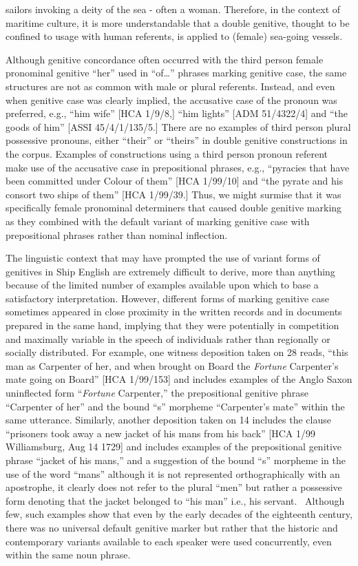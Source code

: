 sailors invoking a deity of the sea - often a woman. Therefore, in the context of maritime culture, it is more understandable that a double genitive, thought to be confined to usage with human referents, is applied to (female) sea-going vessels. 

  Although genitive concordance often occurred with the third person female pronominal genitive “her” used in “of…” phrases marking genitive case, the same structures are not as common with male or plural referents. Instead, and even when genitive case was clearly implied, the accusative case of the pronoun was preferred, e.g., “him wife” [HCA 1/9/8,] “him lights” [ADM 51/4322/4] and “the goods of him” [ASSI 45/4/1/135/5.] There are no examples of third person plural possessive pronouns, either “their” or “theirs” in double genitive constructions in the corpus. Examples of constructions using a third person pronoun referent make use of the accusative case in prepositional phrases, e.g., “pyracies that have been committed under Colour of them” [HCA 1/99/10] and “the pyrate and his consort two ships of them” [HCA 1/99/39.] Thus, we might surmise that it was specifically female pronominal determiners that caused double genitive marking as they combined with the default variant of marking genitive case with prepositional phrases rather than nominal inflection. 

  The linguistic context that may have prompted the use of variant forms of genitives in Ship English are extremely difficult to derive, more than anything because of the limited number of examples available upon which to base a satisfactory interpretation. However, different forms of marking genitive case sometimes appeared in close proximity in the written records and in documents prepared in the same hand, implying that they were potentially in competition and maximally variable in the speech of individuals rather than regionally or socially distributed. For example, one witness deposition taken on 28 \citealt{March1722} reads, “this man as Carpenter of her, and when brought on Board the \textit{Fortune} Carpenter’s mate going on Board” [HCA 1/99/153] and includes examples of the Anglo Saxon uninflected form “\textit{Fortune} Carpenter,” the prepositional genitive phrase “Carpenter of her” and the bound “s” morpheme “Carpenter’s mate” within the same utterance. Similarly, another deposition taken on 14 \citealt{August1729} includes the clause “prisoners took away a new jacket of his mans from his back” [HCA 1/99 Williamsburg, Aug 14 1729] and includes examples of the prepositional genitive phrase “jacket of his mans,” and a suggestion of the bound “s” morpheme in the use of the word “mans” although it is not represented orthographically with an apostrophe, it clearly does not refer to the plural “men” but rather a possessive form denoting that the jacket belonged to “his man” i.e., his servant. ~Although few, such examples show that even by the early decades of the eighteenth century, there was no universal default genitive marker but rather that the historic and contemporary variants available to each speaker were used concurrently, even within the same noun phrase. 

